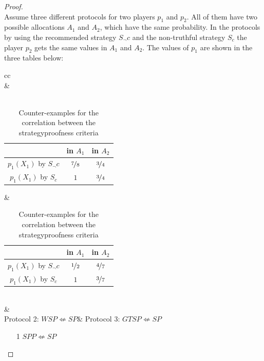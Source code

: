 \begin{proof}
\textcolor{white}{x}\\
\newline
Assume three different protocols for two players $p_1$ and $p_2$. All of them have two possible allocations $A_1$ and $A_2$, which have the same probability. In the protocols by using the recommended strategy $S_\neg c$ and the non-truthful strategy $S_c$ the player $p_2$ gets the same values in $A_1$ and $A_2$. The values of $p_1$ are shown in the three tables below:
\begin{table}[htb]
		\centering
		\renewcommand{\arraystretch}{1.2}
		\begin{tabular}{cc}
			 \\	
 		&\\ 
\\
\begin{tabular}{c|cc}
		& in $A_1$& in $A_2$\\
		\hline
		$p_1(X_1)$ by $S_\neg c$ & {$\nicefrac{7}{8}$} & $\nicefrac{3}{4}$\\ 
  $p_1(X_1)$ by $S_c$& $1$ & {$\nicefrac{3}{4}$}\\ 
 		\end{tabular}&\begin{tabular}{c|cc}
		& in $A_1$& in $A_2$\\
		\hline
		$p_1(X_1)$ by $S_\neg c$ & {$\nicefrac{1}{2}$} & $\nicefrac{4}{7}$\\ 
  $p_1(X_1)$ by $S_c$& $1$ & {$\nicefrac{3}{7}$}\\ 
 		\end{tabular}\\	 
 		&\\
Protocol 2: $WSP \not\Leftarrow SP$& Protocol 3: $GTSP \not\Leftarrow SP$
\end{tabular}
\caption{Counter-examples for the correlation between the strategyproofness criteria}\label{234}
\end{table}
\newpage
\begin{enumerate}
\item[1] $SPP \not\Leftarrow SP$\\

\end{enumerate}
\end{proof}
